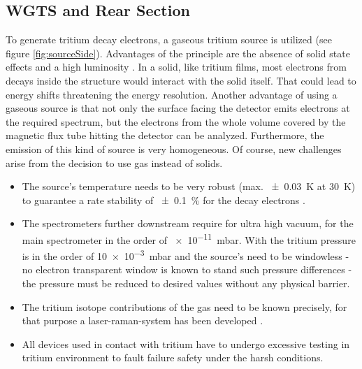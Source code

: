       \subsection{WGTS and Rear Section}
      \label{ch:The KATRIN experiment:sec:Experimental setup:subsec:sourceSide}
      To generate tritium decay electrons, a gaseous tritium source is utilized (see figure \ref{fig:sourceSide}). Advantages of the principle are the absence of solid state effects and a high luminosity \cite{letterOfIntent}. In a solid, like tritium films, most electrons from decays inside the structure would interact with the solid itself. That could lead to energy shifts threatening the energy resolution. Another advantage of using a gaseous source is that not only the surface facing the detector emits electrons at the required spectrum, but the electrons from the whole volume covered by the magnetic flux tube hitting the detector can be analyzed. Furthermore, the emission of this kind of source is very homogeneous. Of course, new challenges arise from the decision to use gas instead of solids.
      \begin{itemize}
		\item The source's temperature needs to be very robust (max. \SI{\pm0.03}{\kelvin} at \SI{30}{\kelvin}) to guarantee a rate stability of \SI{\pm0.1}{\percent} for the decay electrons \cite{temperatureWGTS}.
      	\item The spectrometers further downstream require for ultra high vacuum, for the main spectrometer in the order of \SI{e-11}{\milli\bar}. With the tritium pressure is in the order of \SI{10e-3}{\milli\bar} and the source's need to be windowless - no electron transparent window is known to stand such pressure differences - the pressure must be reduced to desired values without any physical barrier.
      	\item The tritium isotope contributions of the gas need to be known precisely, for that purpose a laser-raman-system has been developed \cite{calibrationRaman}.
      	\item All devices used in contact with tritium have to undergo excessive testing in tritium environment to fault failure safety under the harsh conditions.
      \end{itemize}
      
